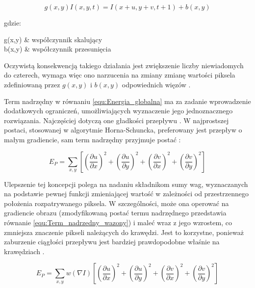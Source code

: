 \begin{equation}
\label{equ:Warunek_stalej_jasnosci_zmodyfikowany}
	g(x,y) I(x, y, t) = I(x + u, y + v, t + 1) + b(x, y)
\end{equation}

\noindent
gdzie:

\begin{conditions}
	g(x,y) & współczynnik skalujący \\
	b(x,y) & współczynnik przesunięcia \\
\end{conditions}

Oczywistą konsekwencją takiego działania jest zwiększenie liczby niewiadomych do czterech, wymaga więc ono narzucenia na zmiany zmianę wartości piksela zdefiniowaną przez $g(x,y)$ i $b(x,y)$ odpowiednich więzów \cite{Baker2011}.

Term nadrzędny w równaniu \ref{equ:Energia_globalna} ma za zadanie wprowadzenie dodatkowych ograniczeń, umożliwiających wyznaczenie jego jednoznacznego rozwiązania. Najczęściej dotyczą one gładkości przepływu \cite{Baker2011}. W najprostszej postaci, stosowanej w algorytmie Horna-Schuncka, preferowany jest przepływ o małym gradiencie, sam term nadrzędny przyjmuje postać \cite{Horn1981} \cite{Baker2011}:

\begin{equation}
\label{equ:Term_nadrzedny}
	E_P = \sum\limits_{x,y}[(\frac{\partial u}{\partial x})^2 +(\frac{\partial u}{\partial y})^2 + (\frac{\partial v}{\partial x})^2 + (\frac{\partial v}{\partial y})^2] 
\end{equation}

Ulepszenie tej koncepcji polega na nadaniu składnikom sumy wag, wyznaczanych na podstawie pewnej funkcji zmieniającej wartość w zależności od przestrzennego położenia rozpatrywanego piksela. W szczególności, może ona operować na gradiencie obrazu (zmodyfikowaną postać termu nadrzędnego przedstawia równanie \ref{equ:Term_nadrzedny_wazony}) i maleć wraz z jego wzrostem, co zmniejsza znaczenie pikseli należących do krawędzi. Jest to korzystne, ponieważ zaburzenie ciągłości przepływu jest bardziej prawdopodobne właśnie na krawędziach \cite{Baker2011}. 

\begin{equation}
\label{equ:Term_nadrzedny_wazony}
	E_P = \sum\limits_{x,y} w(\nabla I) [(\frac{\partial u}{\partial x})^2 +(\frac{\partial u}{\partial y})^2 + (\frac{\partial v}{\partial x})^2 + (\frac{\partial v}{\partial y})^2] 
\end{equation}

